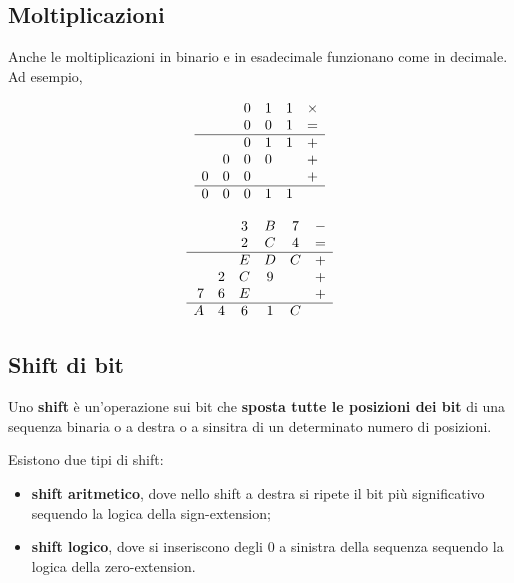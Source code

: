 \documentclass[11pt, a4paper, titlepage, oneside]{scrbook}
\begin{document}
\subsection{Moltiplicazioni}

Anche le moltiplicazioni in binario e in esadecimale funzionano come in decimale. Ad esempio,

\noindent
\begin{minipage}{0.48\textwidth}
\[
\begin{array}{rccccc}
& & 0 & 1 & 1 & \times \\
& & 0 & 0 & 1 & = \\
\hline
& & 0 & 1 & 1 & + \\
& 0 & 0 & 0 & & + \\
0 & 0 & 0 & & & + \\
\hline
0 & 0 & 0 & 1 & 1
\end{array}
\]
\end{minipage}\hfill
\begin{minipage}{0.48\textwidth}
\[
\begin{array}{rccccc}
& & 3 & B & 7 & - \\
& & 2 & C & 4 & = \\
\hline
& & E & D & C & + \\
& 2 & C & 9 & & + \\
7 & 6 & E & & & + \\
\hline
A & 4 & 6 & 1 & C
\end{array}
\]
\end{minipage}

\subsection{Shift di bit}

\begin{Definizione}[Shift]
\label{def-shift}
Uno \textbf{shift} è un'operazione sui bit che \textbf{sposta tutte le posizioni dei bit} di una sequenza binaria o a destra o a sinsitra di un determinato numero di posizioni.
\end{Definizione} 

Esistono due tipi di shift:
\begin{itemize}
    \item \textbf{shift aritmetico}, dove nello shift a destra si ripete il bit più significativo sequendo la logica della sign-extension;
    \item \textbf{shift logico}, dove si inseriscono degli 0 a sinistra della sequenza sequendo la logica della zero-extension.
\end{itemize}
\end{document}

